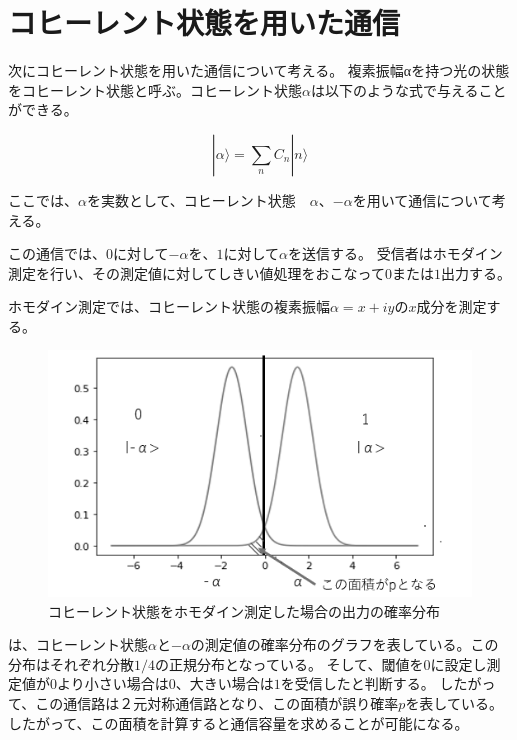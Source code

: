 \chapter{コヒーレント状態を用いた通信}
次にコヒーレント状態を用いた通信について考える。
複素振幅αを持つ光の状態をコヒーレント状態と呼ぶ。コヒーレント状態$\alpha$は以下のような式で与えることができる。

\begin{equation}
|\alpha\rangle=\sum_nC_n|n\rangle
\end{equation}


ここでは、$\alpha$を実数として、コヒーレント状態　$\alpha$、$-\alpha$を用いて通信について考える。

この通信では、$0$に対して$-\alpha$を、$1$に対して$\alpha$を送信する。
受信者はホモダイン測定を行い、その測定値に対してしきい値処理をおこなって$0$または$1$出力する。


ホモダイン測定では、コヒーレント状態の複素振幅$\alpha=x+iy$の$x$成分を測定する。

    \begin{figure}[H]
        \centering   
        \includegraphics[width=1\textwidth]{img/Fig3.png}
        \caption[sample image (png)]{コヒーレント状態をホモダイン測定した場合の出力の確率分布}
        \label{Fig4_1}
    \end{figure}




は、コヒーレント状態$\alpha$と$-\alpha$の測定値の確率分布のグラフを表している。この分布はそれぞれ分散$1/4$の正規分布となっている。
そして、閾値を$0$に設定し測定値が$0$より小さい場合は$0$、大きい場合は$1$を受信したと判断する。
したがって、この通信路は２元対称通信路となり、この面積が誤り確率$p$を表している。
したがって、この面積を計算すると通信容量を求めることが可能になる。


